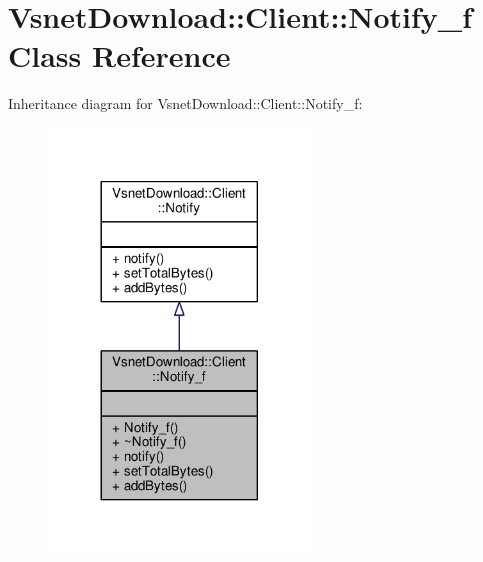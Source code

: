 \hypertarget{classVsnetDownload_1_1Client_1_1Notify__f}{}\section{Vsnet\+Download\+:\+:Client\+:\+:Notify\+\_\+f Class Reference}
\label{classVsnetDownload_1_1Client_1_1Notify__f}


Inheritance diagram for Vsnet\+Download\+:\+:Client\+:\+:Notify\+\_\+f\+:
\nopagebreak
\begin{figure}[H]
\begin{center}
\leavevmode
\includegraphics[width=197pt]{dc/d6e/classVsnetDownload_1_1Client_1_1Notify__f__inherit__graph}
\end{center}
\end{figure}


